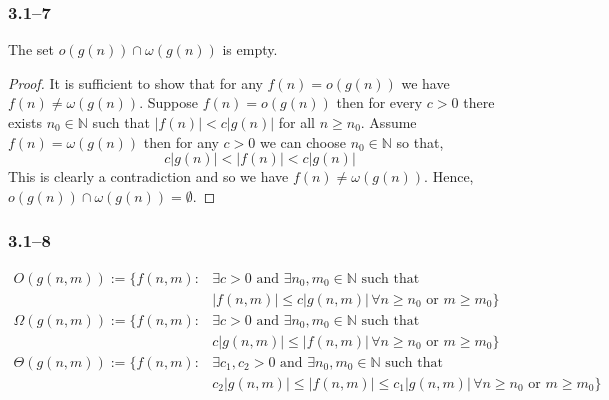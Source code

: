\subsubsection*{3.1--7}

\begin{proposition}
	\label{prop:little-intersection}
	The set $o(g(n))\cap\omega(g(n))$ is empty.
\end{proposition}

\begin{proof}
	It is sufficient to show that for any $f(n)=o(g(n))$ we have $f(n)\neq \omega(g(n))$. Suppose $f(n)=o(g(n))$ then for every $c>0$ there exists $n_{0}\in\mathbb{N}$ such that $\left|f(n)\right| < c\left|g(n)\right|$ for all $n\geq n_{0}$. Assume $f(n)=\omega(g(n))$ then for any $c>0$ we can choose $n_{0}\in\mathbb{N}$ so that,
	\begin{equation*}
		c\left|g(n)\right| < \left|f(n)\right| < c\left|g(n)\right|
	\end{equation*}
	This is clearly a contradiction and so we have $f(n)\neq \omega(g(n))$. Hence, $o(g(n))\cap\omega(g(n))=\emptyset$.
\end{proof}

\subsubsection*{3.1--8}

\begin{equation*}
	\begin{aligned}
		O(g(n,m)) := \{f(n,m)\colon&\exists c>0 \text{ and } \exists n_{0},m_{0}\in\mathbb{N} \text{ such that }\\
		&\left|f(n,m)\right| \leq c\left|g(n,m)\right|\,\forall n\geq n_{0}\text{ or }m\geq m_{0}\}\\
		\Omega(g(n,m)) := \{f(n,m)\colon&\exists c>0 \text{ and } \exists n_{0},m_{0}\in\mathbb{N} \text{ such that }\\
		&c\left|g(n,m)\right| \leq \left|f(n,m)\right|\,\forall n\geq n_{0}\text{ or }m\geq m_{0}\}\\
		\Theta(g(n,m)) := \{f(n,m)\colon&\exists c_{1},c_{2}>0 \text{ and } \exists n_{0},m_{0}\in\mathbb{N} \text{ such that }\\
		&c_{2}\left|g(n,m)\right|\leq\left|f(n,m)\right| \leq c_{1}\left|g(n,m)\right|\,\forall n\geq n_{0}\text{ or }m\geq m_{0}\}
	\end{aligned}
\end{equation*}
